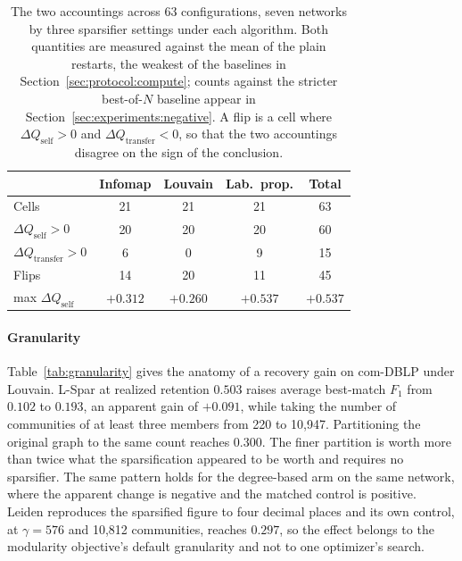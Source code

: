 \begin{table}[t]
\centering
\caption{The two accountings across 63 configurations, seven networks by three
sparsifier settings under each algorithm. Both quantities are measured against
the mean of the plain restarts, the weakest of the baselines in
Section~\ref{sec:protocol:compute}; counts against the stricter best-of-$N$
baseline appear in Section~\ref{sec:experiments:negative}. A flip is a cell where
$\Delta Q_{\mathrm{self}} > 0$ and $\Delta Q_{\mathrm{transfer}} < 0$, so that
the two accountings disagree on the sign of the conclusion.}
\label{tab:accounting}
\small
\setlength{\tabcolsep}{4pt}
\begin{tabular}{@{}lcccc@{}}
\toprule
 & Infomap & Louvain & Lab.\ prop. & Total\\
\midrule
Cells                              & 21 & 21 & 21 & 63\\
$\Delta Q_{\mathrm{self}} > 0$     & 20 & 20 & 20 & 60\\
$\Delta Q_{\mathrm{transfer}} > 0$ & 6  & 0  & 9  & 15\\
Flips                              & 14 & 20 & 11 & 45\\
max $\Delta Q_{\mathrm{self}}$ & $+0.312$ & $+0.260$ & $+0.537$ & $+0.537$\\
\bottomrule
\end{tabular}
\end{table}

\paragraph{Granularity}
Table~\ref{tab:granularity} gives the anatomy of a recovery gain on com-DBLP
under Louvain. L-Spar at realized retention $0.503$ raises average best-match
$F_1$ from $0.102$ to $0.193$, an apparent gain of $+0.091$, while taking the
number of communities of at least three members from 220 to 10{,}947.
Partitioning the original graph to the same count reaches $0.300$. The finer
partition is worth more than twice what the sparsification appeared to be worth
and requires no sparsifier. The same pattern holds for the degree-based arm on
the same network, where the apparent change is negative and the matched control
is positive. Leiden reproduces the sparsified figure to four decimal places and
its own control, at $\gamma = 576$ and 10{,}812 communities, reaches $0.297$, so
the effect belongs to the modularity objective's default granularity and not to
one optimizer's search.

